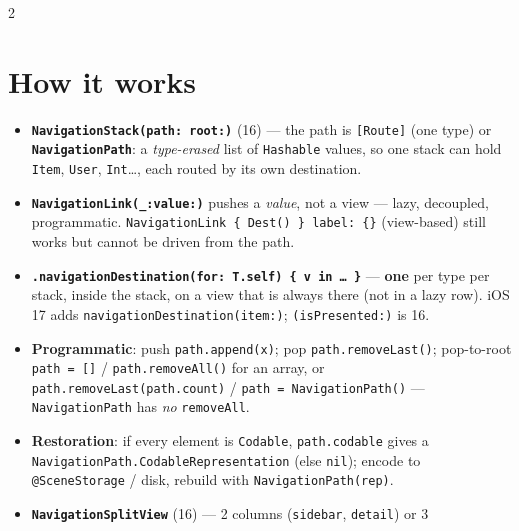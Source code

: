 \documentclass[8pt]{extarticle}
\begin{document}



\begin{multicols}{2}
\raggedright

\section{How it works}
\begin{itemize}
  \item \textbf{\texttt{NavigationStack(path:\,root:)}} (16) — the path is \texttt{[Route]} (one type) or
        \textbf{\texttt{NavigationPath}}: a \emph{type-erased} list of \texttt{Hashable} values, so one stack
        can hold \texttt{Item}, \texttt{User}, \texttt{Int}\ldots, each routed by its own destination.
  \item \textbf{\texttt{NavigationLink(\_:value:)}} pushes a \emph{value}, not a view — lazy, decoupled,
        programmatic. \texttt{NavigationLink \{ Dest() \} label: \{\}} (view-based) still works but cannot be
        driven from the path.
  \item \textbf{\texttt{.navigationDestination(for: T.self) \{ v in … \}}} — \textbf{one} per type per stack,
        inside the stack, on a view that is always there (not in a lazy row).
        iOS 17 adds \texttt{navigationDestination(item:)}; \texttt{(isPresented:)} is 16.
  \item \textbf{Programmatic}: push \texttt{path.append(x)}; pop \texttt{path.removeLast()};
        pop-to-root \texttt{path = []} / \texttt{path.removeAll()} for an array, or
        \texttt{path.removeLast(path.count)} / \texttt{path = NavigationPath()} — \texttt{NavigationPath}
        has \emph{no} \texttt{removeAll}.
  \item \textbf{Restoration}: if every element is \texttt{Codable}, \texttt{path.codable} gives a
        \texttt{NavigationPath.CodableRepresentation} (else \texttt{nil}); encode to \texttt{@SceneStorage}
        / disk, rebuild with \texttt{NavigationPath(rep)}.
  \item \textbf{\texttt{NavigationSplitView}} (16) — 2 columns (\texttt{sidebar}, \texttt{detail}) or 3

\end{itemize}
\end{multicols}
\end{document}

